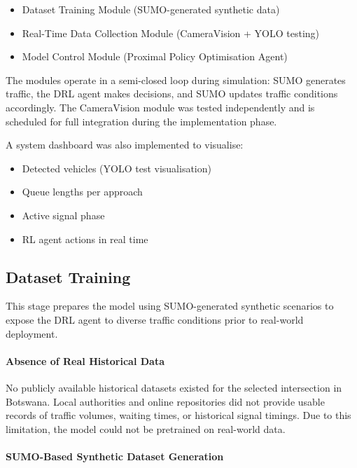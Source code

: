 \documentclass[11pt, a4paper]{report}
\begin{document}
\begin{itemize}
    \item Dataset Training Module (SUMO-generated synthetic data)
    \item Real-Time Data Collection Module (CameraVision + YOLO testing)
    \item Model Control Module (Proximal Policy Optimisation Agent)
\end{itemize}

The modules operate in a semi-closed loop during simulation: SUMO generates traffic, the DRL agent makes decisions, and SUMO updates traffic conditions accordingly. The CameraVision module was tested independently and is scheduled for full integration during the implementation phase.

A system dashboard was also implemented to visualise:

\begin{itemize}
    \item Detected vehicles (YOLO test visualisation)
    \item Queue lengths per approach
    \item Active signal phase
    \item RL agent actions in real time
\end{itemize}

\subsection{Dataset Training}

This stage prepares the model using SUMO-generated synthetic scenarios to expose the DRL agent to diverse traffic conditions prior to real-world deployment.

\paragraph{Absence of Real Historical Data}

No publicly available historical datasets existed for the selected intersection in Botswana. Local authorities and online repositories did not provide usable records of traffic volumes, waiting times, or historical signal timings. Due to this limitation, the model could not be pretrained on real-world data.

\paragraph{SUMO-Based Synthetic Dataset Generation}
\end{document}
